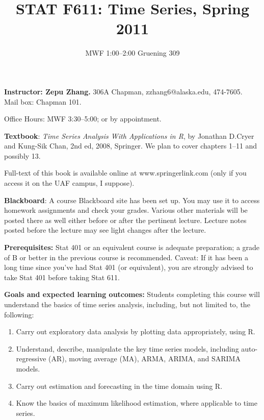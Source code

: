 \documentclass{article}
\begin{document}
\title{STAT F611: Time Series, Spring 2011}
\author{MWF 1:00--2:00 Gruening 309}
\date{}
\maketitle

\textbf{\large Instructor: Zepu Zhang.}
306A Chapman, zzhang6@alaska.edu, 474-7605.\\
Mail box: Chapman 101.

Office Hours: MWF 3:30--5:00; or by appointment.

\bigskip
\textbf{\large Textbook}:
\textit{Time Series Analysis With Applications in R},
by Jonathan D.\@ Cryer and Kung-Sik Chan,
2nd ed, 2008, Springer.
We plan to cover chapters 1--11 and possibly 13.

Full-text of this book is available online at
www.springerlink.com (only if you access it on the UAF campus, I
suppose).

\bigskip
\textbf{\large Blackboard}:
A course Blackboard site has been set up. You may use it to access
homework assignments and check your grades. Various other materials
will be posted there as well either before or after the pertinent
lecture. Lecture notes posted before the lecture may see light
changes after the lecture.


\bigskip
\textbf{\large Prerequisites:}
Stat 401 or an equivalent course is adequate preparation; a grade of B
or better in the previous course is recommended.
Caveat: If it has been a long time since you've had Stat 401 (or equivalent),
you are strongly advised to take Stat 401 before taking
Stat 611.

\bigskip
\textbf{\large Goals and expected learning outcomes:}
Students completing this course will understand the basics of time series analysis,
including, but not limited to, the following:
\begin{enumerate}
\item Carry out exploratory data analysis by plotting data appropriately, using R.
\item Understand, describe, manipulate the key time series models, including auto-regressive
(AR), moving average (MA), ARMA, ARIMA, and SARIMA models.
\item Carry out estimation and forecasting in the time domain using R.
\item Know the basics of maximum likelihood estimation, where applicable to time series.
\end{enumerate}
\end{document}
